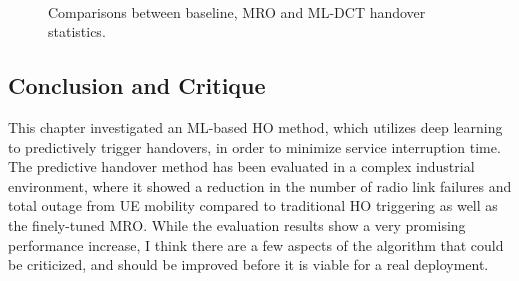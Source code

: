 			\begin{figure}[!ht]
				\centering
				 \\			
				\caption[Predictive handover evaluation results]{Comparisons between baseline, MRO and ML-DCT handover statistics.}
				\label{fig:pred_ho_bars}
			\end{figure}
		
		\subsection{Conclusion and Critique}
			\label{cha:pred_ho:sec:crit}
		
			This chapter investigated an \ac{ML}-based \ac{HO} method, which utilizes deep learning to predictively trigger handovers, in order to minimize service interruption time.
			The predictive handover method has been evaluated in a complex industrial environment, where it showed a reduction in the number of radio link failures and total outage from \ac{UE} mobility compared to traditional \ac{HO} triggering as well as the finely-tuned \ac{MRO}.
			While the evaluation results show a very promising performance increase, I think there are a few aspects of the algorithm that could be criticized, and should be improved before it is viable for a real deployment.
			
